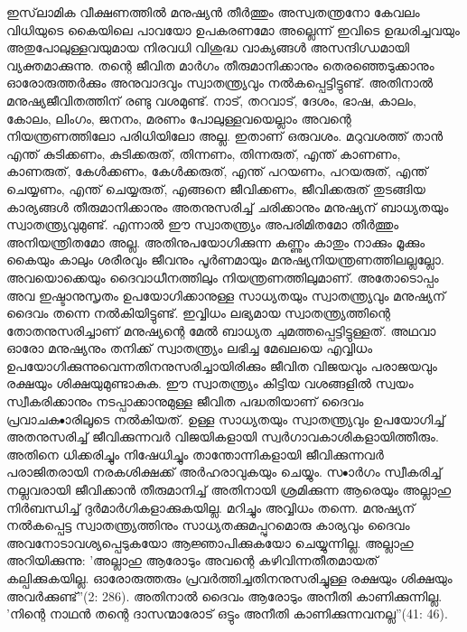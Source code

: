 ഇസ്‌ലാമിക വീക്ഷണത്തില്‍ മനുഷ്യന്‍ തീര്‍ത്തും അസ്വതന്ത്രനോ കേവലം വിധിയുടെ കൈയിലെ പാവയോ ഉപകരണമോ അല്ലെന്ന് ഇവിടെ ഉദ്ധരിച്ചവയും അതുപോലുള്ളവയുമായ നിരവധി വിശുദ്ധ വാക്യങ്ങള്‍ അസന്ദിഗ്ധമായി വ്യക്തമാക്കുന്നു. തന്റെ ജീവിത മാര്‍ഗം തീരുമാനിക്കാനും തെരഞ്ഞെടുക്കാനും ഓരോരുത്തര്‍ക്കും അനുവാദവും സ്വാതന്ത്യ്രവും നല്‍കപ്പെട്ടിട്ടുണ്ട്. അതിനാല്‍ മനുഷ്യജീവിതത്തിന് രണ്ടു വശമുണ്ട്. നാട്, തറവാട്, ദേശം, ഭാഷ, കാലം, കോലം, ലിംഗം, ജനനം, മരണം പോലുള്ളവയെല്ലാം അവന്റെ നിയന്ത്രണത്തിലോ പരിധിയിലോ അല്ല. ഇതാണ് ഒരുവശം. മറുവശത്ത് താന്‍ എന്ത് കുടിക്കണം, കുടിക്കരുത്, തിന്നണം, തിന്നരുത്, എന്ത് കാണണം, കാണരുത്, കേള്‍ക്കണം, കേള്‍ക്കരുത്, എന്ത് പറയണം, പറയരുത്, എന്ത് ചെയ്യണം, എന്ത് ചെയ്യരുത്, എങ്ങനെ ജീവിക്കണം, ജീവിക്കരുത് തുടങ്ങിയ കാര്യങ്ങള്‍ തീരുമാനിക്കാനും അതനുസരിച്ച് ചരിക്കാനും മനുഷ്യന് ബാധ്യതയും സ്വാതന്ത്യ്രവുമുണ്ട്. എന്നാല്‍ ഈ സ്വാതന്ത്യ്രം അപരിമിതമോ തീര്‍ത്തും അനിയന്ത്രിതമോ അല്ല. അതിനുപയോഗിക്കുന്ന കണ്ണും കാതും നാക്കും മൂക്കും കൈയും കാലും ശരീരവും ജീവനും പൂര്‍ണമായും മനുഷ്യനിയന്ത്രണത്തിലല്ലല്ലോ. അവയൊക്കെയും ദൈവാധീനത്തിലും നിയന്ത്രണത്തിലുമാണ്. അതോടൊപ്പം അവ ഇഷ്ടാനുസൃതം ഉപയോഗിക്കാനുള്ള സാധ്യതയും സ്വാതന്ത്യ്രവും മനുഷ്യന് ദൈവം തന്നെ നല്‍കിയിട്ടുണ്ട്. ഇവ്വിധം ലഭ്യമായ സ്വാതന്ത്യ്രത്തിന്റെ തോതനുസരിച്ചാണ് മനുഷ്യന്റെ മേല്‍ ബാധ്യത ചുമത്തപ്പെട്ടിട്ടുള്ളത്. അഥവാ ഓരോ മനുഷ്യനും തനിക്ക് സ്വാതന്ത്യ്രം ലഭിച്ച മേഖലയെ എവ്വിധം ഉപയോഗിക്കുന്നുവെന്നതിനനുസരിച്ചായിരിക്കും ജീവിത വിജയവും പരാജയവും രക്ഷയും ശിക്ഷയുമുണ്ടാകുക. ഈ സ്വാതന്ത്യ്രം കിട്ടിയ വശങ്ങളില്‍ സ്വയം സ്വീകരിക്കാനും നടപ്പാക്കാനുമുള്ള ജീവിത പദ്ധതിയാണ് ദൈവം പ്രവാചക•ാരിലൂടെ നല്‍കിയത്. ഉള്ള സാധ്യതയും സ്വാതന്ത്യ്രവും ഉപയോഗിച്ച് അതനുസരിച്ച് ജീവിക്കുന്നവര്‍ വിജയികളായി സ്വര്‍ഗാവകാശികളായിത്തീരും. അതിനെ ധിക്കരിച്ചും നിഷേധിച്ചും താന്തോന്നികളായി ജീവിക്കുന്നവര്‍ പരാജിതരായി നരകശിക്ഷക്ക് അര്‍ഹരാവുകയും ചെയ്യും. സ•ാര്‍ഗം സ്വീകരിച്ച് നല്ലവരായി ജീവിക്കാന്‍ തീരുമാനിച്ച് അതിനായി ശ്രമിക്കുന്ന ആരെയും അല്ലാഹു നിര്‍ബന്ധിച്ച് ദുര്‍മാര്‍ഗികളാക്കുകയില്ല. മറിച്ചും അവ്വിധം തന്നെ.
മനുഷ്യന് നല്‍കപ്പെട്ട സ്വാതന്ത്യ്രത്തിനും സാധ്യതക്കുമപ്പുറമൊരു കാര്യവും ദൈവം അവനോടാവശ്യപ്പെടുകയോ ആജ്ഞാപിക്കുകയോ ചെയ്യുന്നില്ല. അല്ലാഹു അറിയിക്കുന്നു: 'അല്ലാഹു ആരോടും അവന്റെ കഴിവിന്നതീതമായത് കല്പിക്കുകയില്ല. ഓരോരുത്തരും പ്രവര്‍ത്തിച്ചതിനനുസരിച്ചുള്ള രക്ഷയും ശിക്ഷയും അവര്‍ക്കുണ്ട്''(2: 286).
അതിനാല്‍ ദൈവം ആരോടും അനീതി കാണിക്കുന്നില്ല. 'നിന്റെ നാഥന്‍ തന്റെ ദാസന്മാരോട് ഒട്ടും അനീതി കാണിക്കുന്നവനല്ല''(41: 46).
